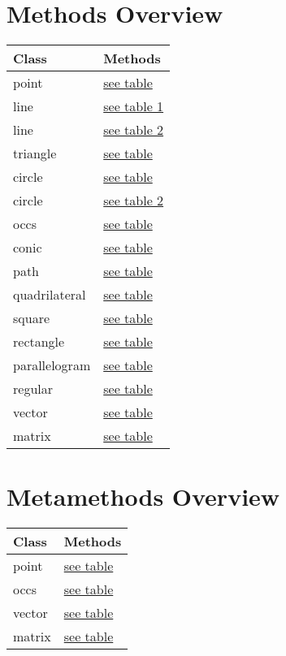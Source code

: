 \documentclass[
  DIV=14,
  fontsize=10,
  index=totoc,
  twoside,
  cadre,
  headings=small
]{tkz-doc}
\begin{document}
\section*{Methods Overview}
\begin{tabular}{ll}
\textbf{Class} & \textbf{Methods} \\
\hline
point & \hyperref[point:methods]{see table}       \\
line & \hyperref[line:methods part 1]{see table 1} \\
line & \hyperref[line:methods part 2]{see table 2} \\
triangle & \hyperref[triangle:methods]{see table} \\
circle & \hyperref[circle:methods]{see table}     \\
circle & \hyperref[circle:methods 2]{see table 2} \\
occs & \hyperref[occs:methods]{see table}         \\
conic & \hyperref[conic:methods]{see table}       \\
path & \hyperref[path:methods]{see table}         \\
quadrilateral & \hyperref[quadrilateral:methods]{see table}\\
square & \hyperref[square:methods]{see table}     \\
rectangle & \hyperref[rectangle:methods]{see table} \\
parallelogram & \hyperref[parallelogram:methods]{see table} \\
regular & \hyperref[regular:methods]{see table}   \\
vector & \hyperref[vector:methods]{see table}   \\
matrix & \hyperref[matrix:methods]{see table} \\
\end{tabular}
\section*{Metamethods Overview}
\begin{tabular}{ll}
\textbf{Class} & \textbf{Methods} \\
\hline
point & \hyperref[point:methods]{see table}       \\
occs & \hyperref[occs:methods]{see table}       \\
vector & \hyperref[vector:methods]{see table}  \\
matrix & \hyperref[matrix:methods]{see table} \\
\end{tabular}
\clearpage
\tableofcontents
\end{document}
